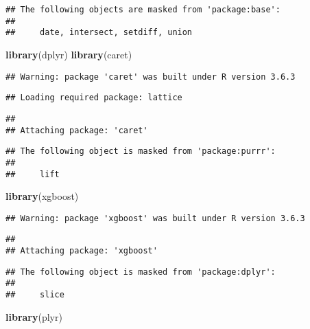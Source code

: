 \documentclass[]{article}
\newenvironment{Shaded}{\begin{snugshade}}{\end{snugshade}}
\newcommand{\KeywordTok}[1]{\textcolor[rgb]{0.13,0.29,0.53}{\textbf{#1}}}
\newcommand{\NormalTok}[1]{#1}
\begin{document}
\begin{verbatim}
## The following objects are masked from 'package:base':
## 
##     date, intersect, setdiff, union
\end{verbatim}

\begin{Shaded}
\begin{Highlighting}[]
\KeywordTok{library}\NormalTok{(dplyr)}
\KeywordTok{library}\NormalTok{(caret)}
\end{Highlighting}
\end{Shaded}

\begin{verbatim}
## Warning: package 'caret' was built under R version 3.6.3
\end{verbatim}

\begin{verbatim}
## Loading required package: lattice
\end{verbatim}

\begin{verbatim}
## 
## Attaching package: 'caret'
\end{verbatim}

\begin{verbatim}
## The following object is masked from 'package:purrr':
## 
##     lift
\end{verbatim}

\begin{Shaded}
\begin{Highlighting}[]
\KeywordTok{library}\NormalTok{(xgboost)}
\end{Highlighting}
\end{Shaded}

\begin{verbatim}
## Warning: package 'xgboost' was built under R version 3.6.3
\end{verbatim}

\begin{verbatim}
## 
## Attaching package: 'xgboost'
\end{verbatim}

\begin{verbatim}
## The following object is masked from 'package:dplyr':
## 
##     slice
\end{verbatim}

\begin{Shaded}
\begin{Highlighting}[]
\KeywordTok{library}\NormalTok{(plyr) }
\end{Highlighting}
\end{Shaded}
\end{document}
